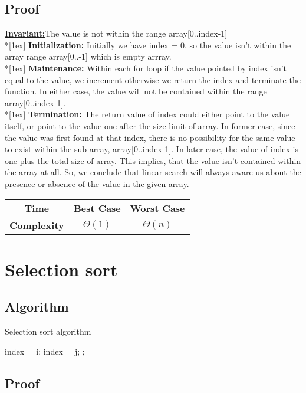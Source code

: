\documentclass{article}
\newcommand{\Invariant}{\textbf{\underline{Invariant:}}}
\newcommand{\topic}[1]{\textbf{#1:}}
\newcommand{\ls}{\\*[1ex]}
\newcommand{\timecase}[2]{ 
    \vspace{1em}
    \begin{center}
    \begin{tabular}{ |c|c|c| }
    \hline
    \textbf{Time} & \textbf{Best Case} & \textbf{Worst Case} \\ \cline{2-3}
    \textbf{Complexity} & $\Theta \left( #1 \right)$ & $\Theta \left( #2 \right)$ \\ \cline{2-3}
    \hline
    \end{tabular}
    \end{center}
}
\begin{document}
\subsection{Proof}

\Invariant The value is not within the range
array[0..index-1]
\ls
\topic{Initialization} Initially we have index = 0, so the value isn't within the array range array[0..-1] which is empty arrray.
\ls
\topic{Maintenance} Within each for loop if the value pointed by index isn't equal to the value, we increment otherwise we return the index and terminate the function. In either case, the value will not be contained within the range array[0..index-1].
\ls
\topic{Termination} The return value of index could either point to the value itself, or point to the value one after the size limit of array. In former case, since the value was first found at that index, there is no possibility for the same value to exist within the sub-array, array[0..index-1]. In later case, the value of index is one plus the total size of array. This implies, that the value isn't contained within the array at all.
So, we conclude that linear search will always aware us about the presence or absence of the value in the given array.

\timecase{1}{n}

\pagebreak

\section{Selection sort}

\subsection{Algorithm}

\begin{algorithm}
    \caption{Selection sort algorithm}
    \begin{algorithmic}[1]
        \State index = i;
        \State index = j;
        \EndIf
        \EndFor
        \State {};
        \EndFor
        \EndFunction
    \end{algorithmic}
\end{algorithm}

\subsection{Proof}
\end{document}
